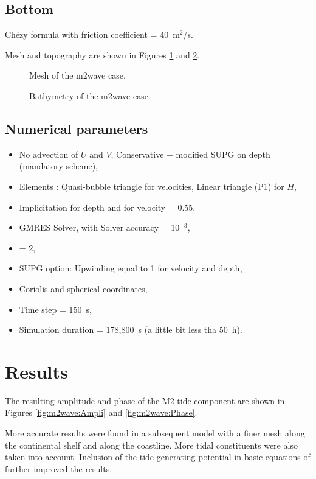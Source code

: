 \subsection{Bottom}
Chézy formula with friction coefficient = 40~m$^2$/s.

Mesh and topography are shown in Figures \ref{fig:m2wave:Mesh} and
\ref{fig:m2wave:Bathy}.

\begin{figure}[H]
 \centering
  \caption{Mesh of the m2wave case.}\label{fig:m2wave:Mesh}
\end{figure}
\begin{figure}[H]
 \centering
  \caption{Bathymetry of the m2wave case.}\label{fig:m2wave:Bathy}
\end{figure}

\subsection{Numerical parameters}
\begin{itemize}
\item No advection of $U$ and $V$, Conservative + modified SUPG on depth (mandatory scheme),
\item Elements : Quasi-bubble triangle for velocities, Linear triangle (P1) for $H$,
\item Implicitation for depth and for velocity = 0.55,
\item GMRES Solver, with  Solver accuracy = 10$^{-3}$,
\item {} = 2,
\item SUPG option: Upwinding equal to 1 for velocity and depth,
\item Coriolis and spherical coordinates,
\item Time step = 150~s,
\item Simulation duration = 178,800~s (a little bit less tha 50~h).
\end{itemize}

\section{Results}
The resulting amplitude and phase of the M2 tide component are shown in Figures
\ref{fig:m2wave:Ampli} and \ref{fig:m2wave:Phase}. 

More accurate results were found in a subsequent model with a finer mesh along the
continental shelf and along the coastline. More tidal constituents were also taken
into account.
Inclusion of the tide generating potential in basic equations of 
further improved the results.

